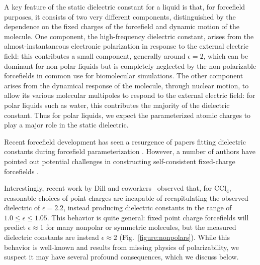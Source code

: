 \documentclass[aps,pre,twocolumn,nofootinbib,superscriptaddress,linenumbers]{revtex4-1}
\begin{document}
A key feature of the static dielectric constant for a liquid is that, for forcefield purposes, it consists of two very different components, distinguished by the dependence on the fixed charges of the forcefield and dynamic motion of the molecule. One component, the high-frequency dielectric constant, arises from the almost-instantaneous electronic polarization in response to the external electric field: this contributes a small component, generally around $\epsilon = 2$, which can be dominant for non-polar liquids but is completely neglected by the non-polarizable forcefields in common use for biomolecular simulations. The other component arises from the dynamical response of the molecule, through nuclear motion, to allow its various molecular multipoles to respond to the external electric field: for polar liquids such as water, this contributes the majority of the dielectric constant. Thus for polar liquids, we expect the parameterized atomic charges to play a major role in the static dielectric.  

Recent forcefield development has seen a resurgence of papers fitting dielectric constants during forcefield parameterization \cite{wang2014building, fennell2014fixed}.  
However, a number of authors have pointed out potential challenges in constructing self-consistent fixed-charge forcefields \cite{fennell2012simple, leontyev2014polarizable}.  


Interestingly, recent work by Dill and coworkers~\cite{fennell2012simple} observed that, for $\mathrm{CCl_4}$, reasonable choices of point charges are incapable of recapitulating the observed dielectric of $\epsilon = 2.2$, instead producing dielectric constants in the range of $1.0 \le \epsilon \le 1.05$.  
This behavior is quite general: fixed point charge forcefields will predict $\epsilon \approx 1$ for many nonpolar or symmetric molecules, but the measured dielectric constants are instead $\epsilon \approx 2$ (Fig.~\ref{figure:nonpolars}).  
While this behavior is well-known and results from missing physics of polarizability, we suspect it may have several profound consequences, which we discuss below.


\end{document}
